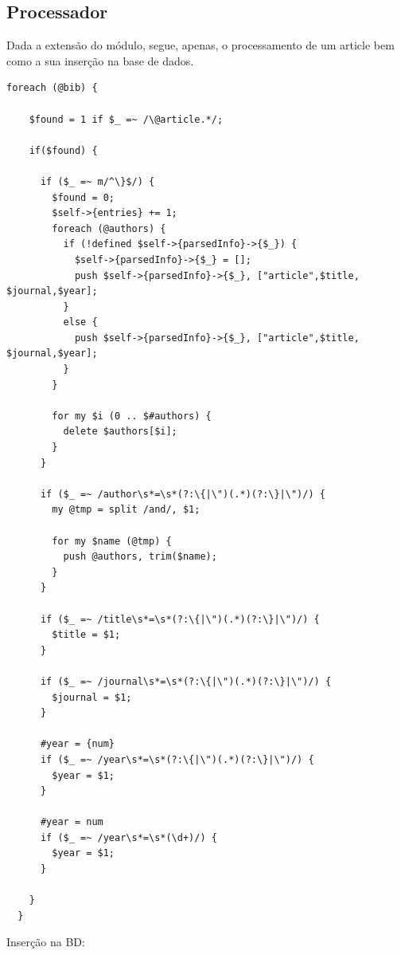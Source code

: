 \documentclass[a4paper,11pt,openright,openbib]{article}
\begin{document}
\subsection{Processador}
Dada a extensão do módulo, segue, apenas, o processamento de um article bem como a sua inserção na base de dados.

\begin{verbatim}
foreach (@bib) {                    
    
    $found = 1 if $_ =~ /\@article.*/;
    
    if($found) {

      if ($_ =~ m/^\}$/) {
        $found = 0;
        $self->{entries} += 1;
        foreach (@authors) {
          if (!defined $self->{parsedInfo}->{$_}) {
            $self->{parsedInfo}->{$_} = [];
            push $self->{parsedInfo}->{$_}, ["article",$title, $journal,$year];
          }
          else {
            push $self->{parsedInfo}->{$_}, ["article",$title, $journal,$year]; 
          }
        }

        for my $i (0 .. $#authors) {
          delete $authors[$i];
        }         
      }       

      if ($_ =~ /author\s*=\s*(?:\{|\")(.*)(?:\}|\")/) {                                        
        my @tmp = split /and/, $1;

        for my $name (@tmp) {
          push @authors, trim($name);       
        }               
      }

      if ($_ =~ /title\s*=\s*(?:\{|\")(.*)(?:\}|\")/) {       
        $title = $1;
      }

      if ($_ =~ /journal\s*=\s*(?:\{|\")(.*)(?:\}|\")/) {       
        $journal = $1;
      }

      #year = {num}
      if ($_ =~ /year\s*=\s*(?:\{|\")(.*)(?:\}|\")/) {        
        $year = $1;
      }

      #year = num
      if ($_ =~ /year\s*=\s*(\d+)/) {       
        $year = $1;
      }                                         
      
    }   
  }
\end{verbatim}
Inserção na BD:\\
\end{document}
